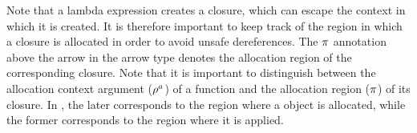 Note that a lambda expression creates a closure, which can escape the
context in which it is created. It is therefore important to keep track of
the region in which a closure is allocated in order to avoid unsafe
dereferences. The $\pi$ annotation above the arrow in the arrow
type denotes the allocation region of the corresponding closure. Note
that it is important to distinguish between the allocation context
argument ($\rho^a$) of a function and the allocation region
($\pi$) of its closure. In \name, the later corresponds to the region where
a  object is allocated, while the former corresponds to the
region where it is applied. 


